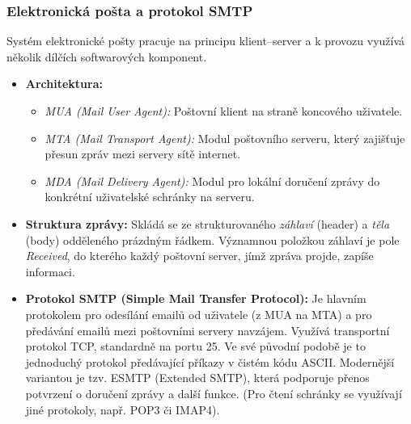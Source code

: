     \subsubsection{Elektronická pošta a protokol SMTP}
        Systém elektronické pošty pracuje na principu klient--server a k provozu využívá několik dílčích softwarových komponent.
        \begin{itemize}
            \item \textbf{Architektura:}
            \begin{itemize}
                \item \textit{MUA (Mail User Agent):} Poštovní klient na straně koncového uživatele.
                \item \textit{MTA (Mail Transport Agent):} Modul poštovního serveru, který zajišťuje přesun zpráv mezi servery sítě internet.
                \item \textit{MDA (Mail Delivery Agent):} Modul pro lokální doručení zprávy do konkrétní uživatelské schránky na serveru.
            \end{itemize}
            \item \textbf{Struktura zprávy:} Skládá se ze strukturovaného \textit{záhlaví} (header) a \textit{těla} (body) odděleného prázdným řádkem. Významnou položkou záhlaví je pole \textit{Received}, do kterého každý poštovní server, jímž zpráva projde, zapíše informaci.
            \item \textbf{Protokol SMTP (Simple Mail Transfer Protocol):} Je hlavním protokolem pro odesílání emailů od uživatele (z MUA na MTA) a pro předávání emailů mezi poštovními servery navzájem. Využívá transportní protokol TCP, standardně na portu 25. Ve své původní podobě je to jednoduchý protokol předávající příkazy v čistém kódu ASCII. Modernější variantou je tzv. ESMTP (Extended SMTP), která podporuje přenos potvrzení o doručení zprávy a další funkce. (Pro čtení schránky se využívají jiné protokoly, např. POP3 či IMAP4).
        \end{itemize}
